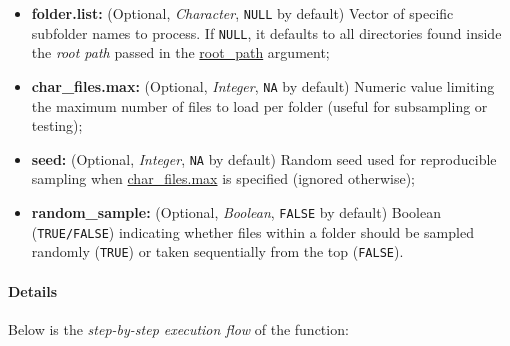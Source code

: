 \documentclass[
]{report}
\providecommand{\tightlist}{%
  \setlength{\itemsep}{0pt}\setlength{\parskip}{0pt}}
\begin{document}
\protect{}\label{func.load_image.list.args.folder.list}
\begin{itemize}
\tightlist
\item
  \textbf{folder.list:} (Optional, \emph{Character}, \texttt{NULL} by default) Vector of specific subfolder names to process. If \texttt{NULL}, it defaults to all directories found inside the \emph{root path} passed in the \hyperref[func.load_image.list.args.root_path]{root\_path} argument;
\end{itemize}

\protect{}\label{func.load_image.list.args.char_files.max}
\begin{itemize}
\tightlist
\item
  \textbf{char\_files.max:} (Optional, \emph{Integer}, \texttt{NA} by default) Numeric value limiting the maximum number of files to load per folder (useful for subsampling or testing);
\end{itemize}

\protect{}\label{func.load_image.list.args.seed}
\begin{itemize}
\tightlist
\item
  \textbf{seed:} (Optional, \emph{Integer}, \texttt{NA} by default) Random seed used for reproducible sampling when \hyperref[func.load_image.list.args.char_files.max]{char\_files.max} is specified (ignored otherwise);
\end{itemize}

\protect{}\label{func.load_image.list.args.random_sample}
\begin{itemize}
\tightlist
\item
  \textbf{random\_sample:} (Optional, \emph{Boolean}, \texttt{FALSE} by default) Boolean (\texttt{TRUE/FALSE}) indicating whether files within a folder should be sampled randomly (\texttt{TRUE}) or taken sequentially from the top (\texttt{FALSE}).
\end{itemize}

\protect{}\label{func.load_image.list.details}
\paragraph{Details}\label{details-1}

\hfill\break

Below is the \emph{step-by-step execution flow} of the function:
\end{document}
